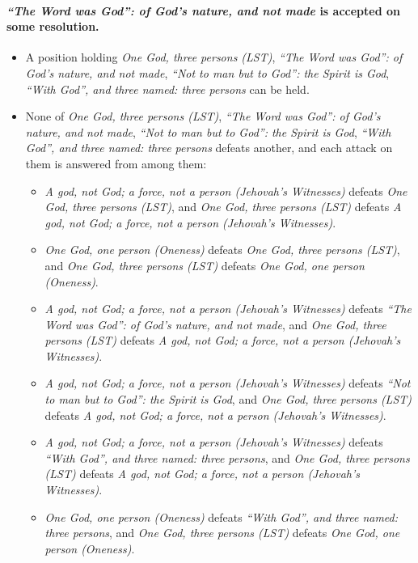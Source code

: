 \documentclass[11pt,paper=\testimonypaper,DIV=13,parskip=false]{scrartcl}
\begin{document}
\paragraph{\emph{“The Word was God”: of God’s nature, and not made} is accepted on some resolution.}
\begin{itemize}
\item A position holding \emph{One God, three persons (LST)}, \emph{“The Word was God”: of God’s nature, and not made}, \emph{“Not to man but to God”: the Spirit is God}, \emph{“With God”, and three named: three persons} can be held.
\item None of \emph{One God, three persons (LST)}, \emph{“The Word was God”: of God’s nature, and not made}, \emph{“Not to man but to God”: the Spirit is God}, \emph{“With God”, and three named: three persons} defeats another, and each attack on them is answered from among them:
\begin{itemize}
\item \emph{A god, not God; a force, not a person (Jehovah’s Witnesses)} defeats \emph{One God, three persons (LST)}, and \emph{One God, three persons (LST)} defeats \emph{A god, not God; a force, not a person (Jehovah’s Witnesses)}.
\item \emph{One God, one person (Oneness)} defeats \emph{One God, three persons (LST)}, and \emph{One God, three persons (LST)} defeats \emph{One God, one person (Oneness)}.
\item \emph{A god, not God; a force, not a person (Jehovah’s Witnesses)} defeats \emph{“The Word was God”: of God’s nature, and not made}, and \emph{One God, three persons (LST)} defeats \emph{A god, not God; a force, not a person (Jehovah’s Witnesses)}.
\item \emph{A god, not God; a force, not a person (Jehovah’s Witnesses)} defeats \emph{“Not to man but to God”: the Spirit is God}, and \emph{One God, three persons (LST)} defeats \emph{A god, not God; a force, not a person (Jehovah’s Witnesses)}.
\item \emph{A god, not God; a force, not a person (Jehovah’s Witnesses)} defeats \emph{“With God”, and three named: three persons}, and \emph{One God, three persons (LST)} defeats \emph{A god, not God; a force, not a person (Jehovah’s Witnesses)}.
\item \emph{One God, one person (Oneness)} defeats \emph{“With God”, and three named: three persons}, and \emph{One God, three persons (LST)} defeats \emph{One God, one person (Oneness)}.
\end{itemize}
\end{itemize}
\end{document}
